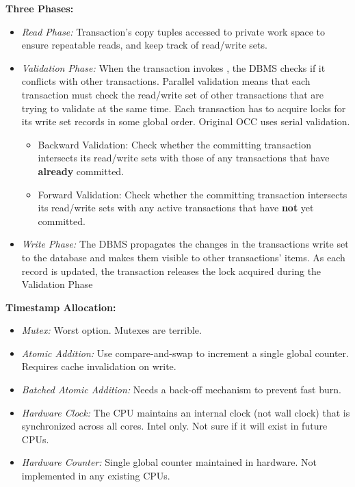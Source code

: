 \documentclass[11pt]{article}
\begin{document}
\textbf{Three Phases:}
\begin{itemize}
    \item \textit{Read Phase:}
    Transaction's copy tuples accessed to private work space to ensure repeatable reads, and keep 
    track of read/write sets.
    
    \item \textit{Validation Phase:}
    When the transaction invokes , the DBMS checks if it conflicts with other 
transactions.
    Parallel validation means that each transaction must check the read/write set of other 
transactions 
    that are trying to validate at the same time. Each transaction has to acquire locks for its 
write set 
    records in some global order. Original OCC uses serial validation.
    \begin{itemize}
        \item Backward Validation:
        Check whether the committing transaction intersects its read/write sets with those of any 
transactions that         have \textbf{already} committed.
        
        \item Forward Validation:
        Check whether the committing transaction intersects its read/write sets with any active 
transactions that         have \textbf{not} yet committed.
    \end{itemize}
    
    \item \textit{Write Phase:}
    The DBMS propagates the changes in the transactions write set to the database and makes them 
    visible to other transactions' items. As each record is updated, the transaction releases the 
lock acquired     during the Validation Phase
\end{itemize}

\textbf{Timestamp Allocation:}~\cite{p209-yu}
\begin{itemize}
    \item \textit{Mutex:}
    Worst option. Mutexes are terrible.
    
    \item \textit{Atomic Addition:}
    Use compare-and-swap to increment a single global counter. Requires cache invalidation on write.
    
    \item \textit{Batched Atomic Addition:}
    Needs a back-off mechanism to prevent fast burn.

    \item \textit{Hardware Clock:}
    The CPU maintains an internal clock (not wall clock) that is synchronized across all cores.
    Intel only. Not sure if it will exist in future CPUs.
    
    \item \textit{Hardware Counter:}
    Single global counter maintained in hardware. Not implemented in any existing CPUs.
\end{itemize}
\end{document}
